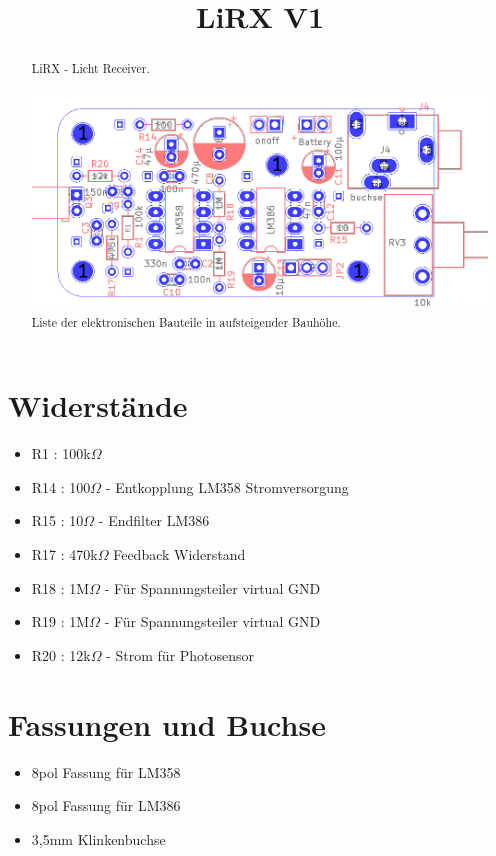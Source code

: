 \documentclass[]{article}
\title{LiRX V1}
\author{}
\date{}
\begin{document}
\maketitle

\begin{abstract}
	LiRX - Licht Receiver.
	
		
	
	\includegraphics[width=1.0\linewidth]{Platine.png}
Liste der elektronischen Bauteile in aufsteigender Bauhöhe.
\end{abstract}

\section{Widerstände}
\begin{itemize}
	\item R1 :	100k$\Omega$
	\item R14 : 100$\Omega$ - Entkopplung LM358 Stromversorgung
	\item R15 : 10$\Omega$ - Endfilter LM386
	\item R17 : 470k$\Omega$ Feedback Widerstand
	\item R18 : 1M$\Omega$ - Für Spannungsteiler virtual GND 
	\item R19 : 1M$\Omega$ - Für Spannungsteiler virtual GND
	\item R20 : 12k$\Omega$ - Strom für Photosensor
\end{itemize}
\section{Fassungen und Buchse}
\begin{itemize}
	\item 8pol Fassung für LM358
	\item 8pol Fassung für LM386
	\item 3,5mm Klinkenbuchse
\end{itemize}
\end{document}
